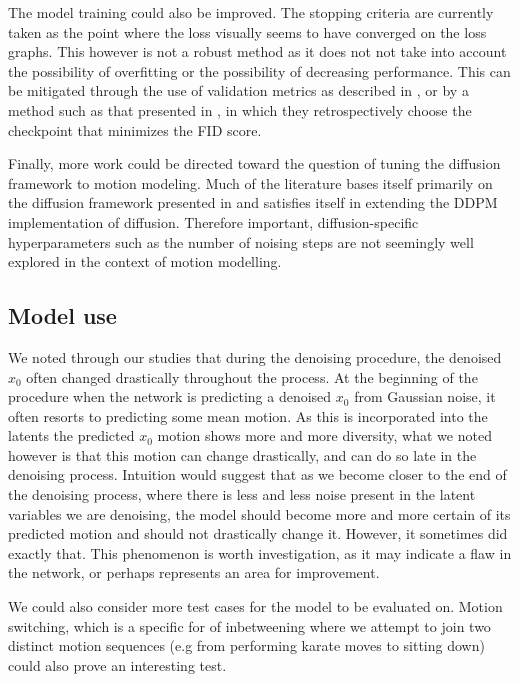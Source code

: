 The model training could also be improved. The stopping criteria are currently taken as the point where the loss visually seems to have converged on the loss graphs. This however is not a robust method as it does not not take into account the possibility of overfitting or the possibility of decreasing performance. This can be mitigated through the use of validation metrics as described in , or by a method such as that presented in \cite{MDM}, in which they retrospectively choose the checkpoint that minimizes the FID score.

Finally, more work could be directed toward the question of tuning the diffusion framework to motion modeling. Much of the literature \cite{EDGE,MDM,PhysDiff} bases itself primarily on the diffusion framework presented in \cite{ddpm} and satisfies itself in extending the DDPM implementation of diffusion. Therefore important, diffusion-specific hyperparameters such as the number of noising steps are not seemingly well explored in the context of motion modelling.

\subsection{Model use}

We noted through our studies that during the denoising procedure, the denoised $x_0$ often changed drastically throughout the process. At the beginning of the procedure when the network is predicting a denoised $x_0$ from Gaussian noise, it often resorts to predicting some mean motion. As this is incorporated into the latents the predicted $x_0$ motion shows more and more diversity, what we noted however is that this motion can change drastically, and can do so late in the denoising process. Intuition would suggest that as we become closer to the end of the denoising process, where there is less and less noise present in the latent variables we are denoising, the model should become more and more certain of its predicted motion and should not drastically change it. However, it sometimes did exactly that. This phenomenon is worth investigation, as it may indicate a flaw in the network, or perhaps represents an area for improvement.

We could also consider more test cases for the model to be evaluated on. Motion switching, which is a specific for of inbetweening where we attempt to join two distinct motion sequences (e.g from performing karate moves to sitting down) could also prove an interesting test.

